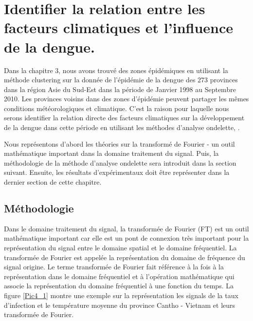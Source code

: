 
\chapter{Identifier la relation entre les facteurs climatiques et l'influence de la dengue.}
\label{chap4}

Dans la chapitre 3, nous avons trouvé des zones épidémiques en utilisant la méthode clustering sur la donnée de l'épidémie de la dengue des 273 provinces dans la région Asie du Sud-Est dans la période de Janvier 1998 au Septembre 2010. Les provinces voisins dans des zones d'épidémie peuvent partager les mêmes conditions météorologiques et climatique. C'est la raison pour laquelle nous serons identifier la relation directe des facteurs climatiques sur la développement de la dengue dans cette période en utilisant les méthodes d'analyse ondelette, . 

Nous représentons d'abord les théories sur la transformé de Fourier - un outil mathématique important dans la domaine traitement du signal. Puis, la méthodologie de la méthode d'analyse ondelette sera introduit dans la section suivant. Ensuite, les résultats d'expérimentaux doit être représenter dans la dernier section de cette chapitre. 


\section {Méthodologie}
Dans le domaine traitement du signal, la transformée de Fourier (FT) est un outil mathématique important car elle est un pont de connexion très important pour la représentation du signal entre le domaine spatial et le domaine fréquentiel. La transformée de Fourier est appelée la représentation du domaine de fréquence du signal origine. Le terme transformée de Fourier fait référence à la fois à la représentation dans le domaine fréquentiel et à l'opération mathématique qui associe la représentation du domaine fréquentiel à une fonction du temps. La figure \ref{Pic4_1} montre une exemple sur la représentation les signals de la taux d'infection et le température moyenne du province Cantho - Vietnam et leurs transformée de Fourier. 

